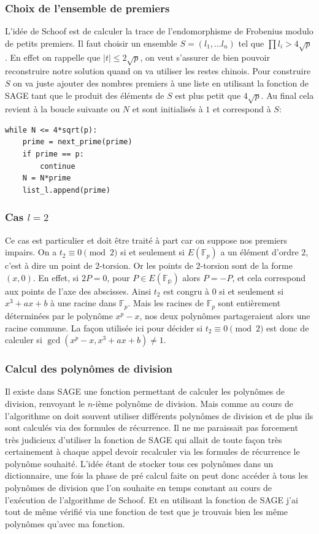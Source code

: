 \documentclass[12pt]{article}
\begin{document}
\subsubsection{Choix de l'ensemble de premiers}
L'idée de Schoof est de calculer la trace de l'endomorphisme de Frobenius modulo de petits premiers. Il faut choisir un ensemble $S = (l_1, \ldots l_n)$ tel que $\prod l_i > 4\sqrt{p}$. En effet on rappelle que  $|t| \leq 2 \sqrt{p}$, on veut s'assurer de bien pouvoir reconstruire notre solution quand on va utiliser les restes chinois. Pour construire $S$ on va juste ajouter des nombres premiers à une liste en utilisant la fonction  de SAGE tant que le produit des éléments de $S$ est plus petit que $ 4\sqrt{p}$. Au final cela revient à la boucle suivante ou $N$ et  sont initialisés à $1$ et  correspond à $S$:
\bigskip

\begin{lstlisting}
while N <= 4*sqrt(p):
	prime = next_prime(prime)
	if prime == p:
		continue
	N = N*prime
	list_l.append(prime)
\end{lstlisting}


\subsubsection{Cas $l=2$}
Ce cas est particulier et doit être traité à part car on suppose nos premiers impairs. On a $t_2 \equiv 0 \pmod 2$ si et seulement si $E(\mathbb{F}_p)$ a un élément d'ordre $2$, c'est à dire un point de $2$-torsion. Or les points de $2$-torsion sont de la forme $(x, 0)$. En effet, si $2P = 0$, pour $P \in E(\mathbb{F_p})$ alors $P = -P$, et cela correspond aux points de l'axe des abscisses. Ainsi $t_2$ est congru à $0$ si et seulement si $x^3 +ax +b$ à une racine dans $\mathbb{F}_p$. Mais les racines de $\mathbb{F}_p$ sont entièrement déterminées par le polynôme $x^p - x$, nos deux polynômes partageraient alors une racine commune. La façon utilisée ici pour décider si $t_2 \equiv 0 \pmod 2$ est donc de calculer si $\gcd(x^p - x, x^3 +ax +b) \ne 1$.

\subsubsection{Calcul des polynômes de division}
Il existe dans SAGE une fonction permettant de calculer les polynômes de division,  renvoyant le $n$-ième polynôme de division. Mais comme au cours de l'algorithme on doit souvent utiliser différents polynômes de division et de plus ils sont calculés via des formules de récurrence. Il ne me paraissait pas forcement très judicieux d'utiliser la fonction de SAGE qui allait de toute façon très certainement à chaque appel devoir recalculer via les formules de récurrence le polynôme souhaité. L'idée étant de stocker tous ces polynômes dans un dictionnaire, une fois la phase de pré calcul faite on peut donc accéder à tous les polynômes de division que l'on souhaite en temps constant au cours de l'exécution de l'algorithme de Schoof. Et en utilisant la fonction de SAGE j'ai tout de même vérifié via une fonction de test que je trouvais bien les même polynômes qu'avec ma fonction.
\end{document}
